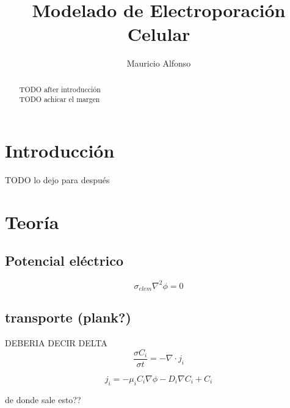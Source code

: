 \documentclass[a4paper,10pt]{article}
\title{Modelado de Electroporación Celular}
\author{Mauricio Alfonso}
\begin{document}
\maketitle

\begin{abstract}
TODO after introducción\\

TODO achicar el margen\\

\end{abstract}


\section{Introducción}
TODO lo dejo para después


\section{Teoría}

\subsection{Potencial eléctrico}

\begin{equation} \label{eq:poisson}
	\sigma_{elem} \nabla^{2} \phi = 0 
\end{equation}

\subsection{transporte (plank?)}

DEBERIA DECIR DELTA
\begin{equation} \label{eq:trans1}
	\frac{\sigma C_i}{\sigma t} = -\nabla \cdot j_i
\end{equation}

\begin{equation} \label{eq:trans2}
	j_i = -\mu_i C_i \nabla \phi - D_i \nabla C_i + C_i
\end{equation}

de donde sale esto??
\end{document}

